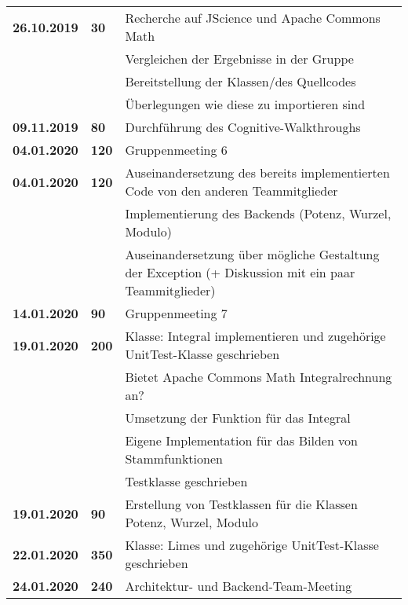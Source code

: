 {\begin{longtable}{|l|l|p{11cm}|}
		\textbf{26.10.2019} 
		& \textbf{\hfill30} & 
				Recherche auf JScience und Apache Commons Math \\ & &
				Vergleichen der Ergebnisse in der Gruppe \\ & &
				Bereitstellung der Klassen/des Quellcodes \\ & &
				Überlegungen wie diese zu importieren sind 
		\\ \hline
		
		\textbf{09.11.2019} 
		& \textbf{\hfill80} & Durchführung des Cognitive-Walkthroughs
		\\ \hline
		
		\textbf{04.01.2020} 
		& \textbf{\hfill120} & Gruppenmeeting 6
		\\ \hline
		
		\textbf{04.01.2020} 
		& \textbf{\hfill120} & 
				Auseinandersetzung des bereits implementierten Code von den anderen Teammitglieder \\ & &
				Implementierung des Backends (Potenz, Wurzel, Modulo) \\ & &
				Auseinandersetzung über mögliche Gestaltung der Exception (+ Diskussion mit ein paar Teammitglieder)
		\\ \hline
		
		\textbf{14.01.2020} 
		& \textbf{\hfill90} & Gruppenmeeting 7
		\\ \hline
		
		\textbf{19.01.2020} 
		& \textbf{\hfill200} & 
			Klasse: Integral implementieren und zugehörige UnitTest-Klasse geschrieben \\ & &
			Bietet Apache Commons Math Integralrechnung an? \\ & &
			Umsetzung der Funktion für das Integral \\ & &
			Eigene Implementation für das Bilden von Stammfunktionen \\  & &
			Testklasse geschrieben
		\\ \hline
		
		\textbf{19.01.2020} 
		& \textbf{\hfill90} & Erstellung von Testklassen für die Klassen Potenz, Wurzel, Modulo
		\\ \hline
		
		\textbf{22.01.2020} 
		& \textbf{\hfill350} & Klasse: Limes und zugehörige UnitTest-Klasse geschrieben
		\\ \hline
		
		\textbf{24.01.2020} 
		& \textbf{\hfill240} & Architektur- und Backend-Team-Meeting
		\\ \hline
		

\end{longtable}}
